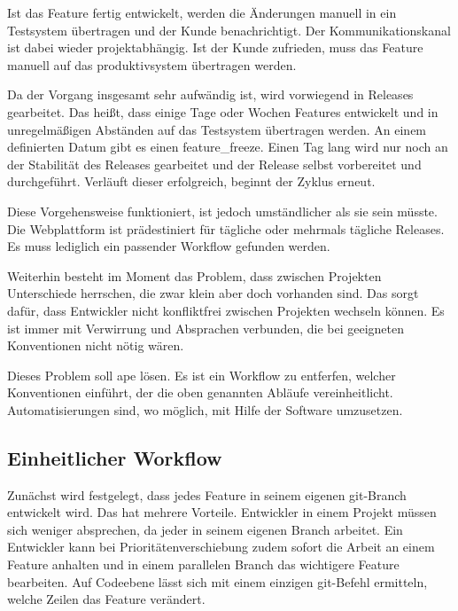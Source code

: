 Ist das Feature fertig entwickelt, werden die Änderungen manuell in ein Testsystem übertragen und der Kunde benachrichtigt. Der Kommunikationskanal ist dabei wieder projektabhängig. Ist der Kunde zufrieden, muss das Feature manuell auf das \gls{produktivsystem} übertragen werden.

Da der Vorgang insgesamt sehr aufwändig ist, wird vorwiegend in Releases gearbeitet. Das heißt, dass einige Tage oder Wochen Features entwickelt und in unregelmäßigen Abständen auf das Testsystem übertragen werden. An einem definierten Datum gibt es einen \gls{feature_freeze}. Einen Tag lang wird nur noch an der Stabilität des Releases gearbeitet und der Release selbst vorbereitet und durchgeführt. Verläuft dieser erfolgreich, beginnt der Zyklus erneut.

Diese Vorgehensweise funktioniert, ist jedoch umständlicher als sie sein müsste. Die Webplattform ist prädestiniert für tägliche oder mehrmals tägliche Releases. Es muss lediglich ein passender Workflow gefunden werden.

Weiterhin besteht im Moment das Problem, dass zwischen Projekten Unterschiede herrschen, die zwar klein aber doch vorhanden sind. Das sorgt dafür, dass Entwickler nicht konfliktfrei zwischen Projekten wechseln können. Es ist immer mit Verwirrung und Absprachen verbunden, die bei geeigneten Konventionen nicht nötig wären.

Dieses Problem soll \gls{ape} lösen. Es ist ein Workflow zu entferfen, welcher Konventionen einführt, der die oben genannten Abläufe vereinheitlicht. Automatisierungen sind, wo möglich, mit Hilfe der Software umzusetzen.


\subsection{Einheitlicher Workflow} %
\label{sub:einheitlicher_workflow}

Zunächst wird festgelegt, dass jedes Feature in seinem eigenen \gls{git}-Branch entwickelt wird. Das hat mehrere Vorteile. Entwickler in einem Projekt müssen sich weniger absprechen, da jeder in seinem eigenen Branch arbeitet. Ein Entwickler kann bei Prioritätenverschiebung zudem sofort die Arbeit an einem Feature anhalten und in einem parallelen Branch das wichtigere Feature bearbeiten. Auf Codeebene lässt sich mit einem einzigen \gls{git}-Befehl ermitteln, welche Zeilen das Feature verändert.

